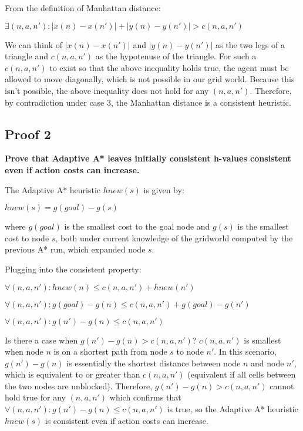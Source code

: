 \documentclass[10pt,a4paper]{article}
\begin{document}
From the definition of Manhattan distance:
\begin{center} $\exists(n, a, n'): |x(n) - x(n')| + |y(n) - y(n')| > c(n, a, n')$\end{center}

We can think of $|x(n) - x(n')|$ and $|y(n) - y(n')|$ as the two legs of a triangle and $c(n, a, n')$ as the hypotenuse of the triangle. For such a $c(n, a, n')$ to exist so that the above inequality holds true, the agent must be allowed to move diagonally, which is not possible in our grid world. Because this isn't possible, the above inequality does not hold for any $(n, a, n')$. Therefore, by contradiction under case 3, the Manhattan distance is a consistent heuristic.

\subsection*{Proof 2}
\textbf{Prove that Adaptive A* leaves initially consistent h-values consistent even if action costs can increase.}

The Adaptive A* heuristic $hnew(s)$ is given by:
\begin{center} $hnew(s) = g(goal) - g(s) $\end{center}

where $g(goal)$ is the smallest cost to the goal node and $g(s)$ is the smallest cost to node $s$, both under current knowledge of the gridworld computed by the previous A* run, which expanded node $s$.

Plugging into the consistent property:
\begin{center} $\forall(n, a, n'): hnew(n) \leq c(n, a, n') + hnew(n')$\end{center}
\begin{center} $\forall(n, a, n'): g(goal) - g(n) \leq c(n, a, n') + g(goal) - g(n')$\end{center}
\begin{center} $\forall(n, a, n'): g(n') - g(n) \leq c(n, a, n')$\end{center}

Is there a case when $g(n') - g(n) > c(n, a, n')$? $c(n, a, n')$ is smallest when node $n$ is on a shortest path from node $s$ to node $n'$. In this scenario, $g(n') - g(n)$ is essentially the shortest distance between node $n$ and node $n'$, which is equivalent to or greater than $c(n, a, n')$ (equivalent if all cells between the two nodes are unblocked). Therefore, $g(n') - g(n) > c(n, a, n')$ cannot hold true for any $(n, a, n')$ which confirms that $\forall(n, a, n'): g(n') - g(n) \leq c(n, a, n')$ is true, so the Adaptive A* heuristic $hnew(s)$ is consistent even if action costs can increase.
\end{document}
